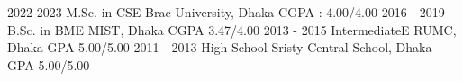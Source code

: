 
\horizontalLineLeft

\educationItem
    {2022-2023}
    {M.Sc. in CSE}
    {Brac University, Dhaka}
    {CGPA : 4.00/4.00}
\educationItem
    {2016 - 2019}
    {B.Sc. in BME}
    {MIST, Dhaka}
    {CGPA 3.47/4.00}
\educationItem
    {2013 - 2015}
    {IntermediateE}
    {RUMC, Dhaka}
    {GPA 5.00/5.00}
\educationItem
    {2011 - 2013}
    {High School}
    {Sristy Central School, Dhaka}
    {GPA 5.00/5.00}
\sectionsep